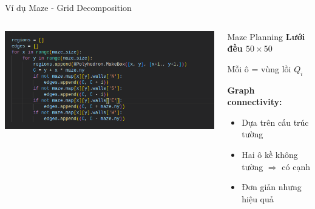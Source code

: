 \documentclass[aspectratio=169]{beamer}
\begin{document}
\begin{frame}{Ví dụ Maze - Grid Decomposition}
    \begin{columns}[c]
        \includegraphics[width=\textwidth]{../imgs/maze-decompose.png}

        \begin{block}{Maze Planning}
            \small
            \textbf{Lưới đều $50 \times 50$}

            \vspace{0.3cm}
            Mỗi ô = vùng lồi $Q_i$

            \vspace{0.3cm}
            \textbf{Graph connectivity:}
            \begin{itemize}
                \item Dựa trên cấu trúc tường
                \item Hai ô kề không tường $\Rightarrow$ có cạnh
                \item Đơn giản nhưng hiệu quả
            \end{itemize}
        \end{block}
    \end{columns}
\end{frame}
\end{document}
